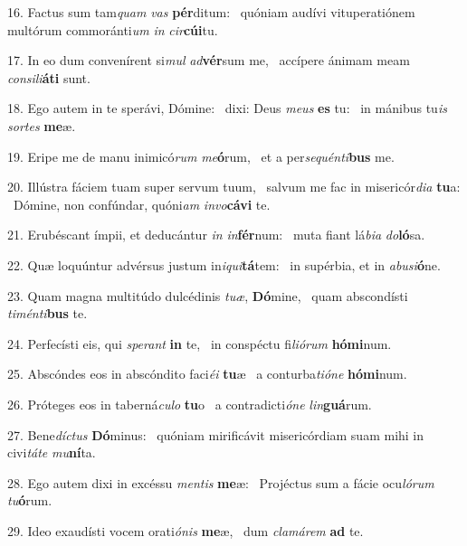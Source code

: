 16. Factus sum tam\textit{quam} \textit{vas} \textbf{pér}ditum: \ast\  quóniam audívi vituperatiónem multórum commoránti\textit{um} \textit{in} \textit{cir}\textbf{cú}\textbf{i}tu.\

17. In eo dum convenírent si\textit{mul} \textit{ad}\textbf{vér}sum me, \ast\  accípere ánimam meam \textit{con}\textit{si}\textit{li}\textbf{á}\textbf{ti} sunt.\

18. Ego autem in te sperávi, Dómine: \dag\  dixi: Deus \textit{me}\textit{us} \textbf{es} tu: \ast\  in mánibus tu\textit{is} \textit{sor}\textit{tes} \textbf{me}æ.\

19. Eripe me de manu inimicó\textit{rum} \textit{me}\textbf{ó}rum, \ast\  et a per\textit{se}\textit{quén}\textit{ti}\textbf{bus} me.\

20. Illústra fáciem tuam super servum tuum, \dag\  salvum me fac in misericór\textit{di}\textit{a} \textbf{tu}a: \ast\  Dómine, non confúndar, quóni\textit{am} \textit{in}\textit{vo}\textbf{cá}\textbf{vi} te.\

21. Erubéscant ímpii, et deducántur \textit{in} \textit{in}\textbf{fér}num: \ast\  muta fiant lá\textit{bi}\textit{a} \textit{do}\textbf{ló}sa.\

22. Quæ loquúntur advérsus justum in\textit{i}\textit{qui}\textbf{tá}tem: \ast\  in supérbia, et in \textit{ab}\textit{u}\textit{si}\textbf{ó}ne.\

23. Quam magna multitúdo dulcédinis \textit{tu}\textit{æ}, \textbf{Dó}mine, \ast\  quam abscondísti \textit{ti}\textit{mén}\textit{ti}\textbf{bus} te.\

24. Perfecísti eis, qui \textit{spe}\textit{rant} \textbf{in} te, \ast\  in conspéctu fi\textit{li}\textit{ó}\textit{rum} \textbf{hó}\textbf{mi}num.\

25. Abscóndes eos in abscóndito faci\textit{é}\textit{i} \textbf{tu}æ \ast\  a conturba\textit{ti}\textit{ó}\textit{ne} \textbf{hó}\textbf{mi}num.\

26. Próteges eos in taberná\textit{cu}\textit{lo} \textbf{tu}o \ast\  a contradicti\textit{ó}\textit{ne} \textit{lin}\textbf{guá}rum.\

27. Bene\textit{díc}\textit{tus} \textbf{Dó}minus: \ast\  quóniam mirificávit misericórdiam suam mihi in civi\textit{tá}\textit{te} \textit{mu}\textbf{ní}ta.\

28. Ego autem dixi in excéssu \textit{men}\textit{tis} \textbf{me}æ: \ast\  Projéctus sum a fácie ocu\textit{ló}\textit{rum} \textit{tu}\textbf{ó}rum.\

29. Ideo exaudísti vocem orati\textit{ó}\textit{nis} \textbf{me}æ, \ast\  dum \textit{cla}\textit{má}\textit{rem} \textbf{ad} te.\


